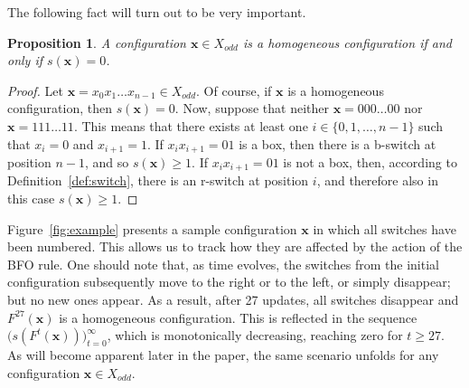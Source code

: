 \documentclass{sn-jnl}
\newtheorem{prop}{Proposition}%
\newcommand{\xodd}{X_{odd}}
\newcommand{\bx}{\mathbf{x}}
\begin{document}
The following fact will turn out to be very important.
\begin{prop}
\label{prop:hom=0}
A configuration $\bx\in\xodd$ is a homogeneous configuration if and only if $s(\bx)=0$.   
\end{prop}
\begin{proof}
    Let $\bx = x_0x_1\ldots x_{n-1}\in \xodd$. Of course, if $\bx$ is a homogeneous configuration, then $s(\bx)=0$. Now, suppose that neither $\bx = 000\ldots00$ nor $\bx = 111\ldots 11$. This means that there exists at least one $i\in\{0,1,\ldots,n-1\}$ such that $x_i=0$ and $x_{i+1}=1$. If $x_ix_{i+1}=01$ is a box, then there is a b-switch at position $n-1$, and so $s(\bx)\geq 1$. If $x_ix_{i+1}=01$ is not a box, then, according to Definition~\ref{def:switch}, there is an r-switch at position $i$, and therefore also in this case $s(\bx)\geq 1$.
\end{proof}


Figure~\ref{fig:example} presents a sample configuration $\bx$ in which all switches have been numbered. This allows us to track how they are affected by the action of the BFO rule.
One should note that, as time evolves, the switches from the initial configuration subsequently move to the right or to the left, or simply disappear; but no new ones appear.
As a result, after 27 updates, all switches disappear and $F^{27}(\bx)$ is a homogeneous configuration.
This is reflected in the sequence $\big(s(F^t(\bx))\big)_{t=0}^\infty$, which is monotonically decreasing, reaching zero for $t\geq 27$. As will become apparent later in the paper, the same scenario unfolds for any configuration $\bx\in \xodd$.
\end{document}
